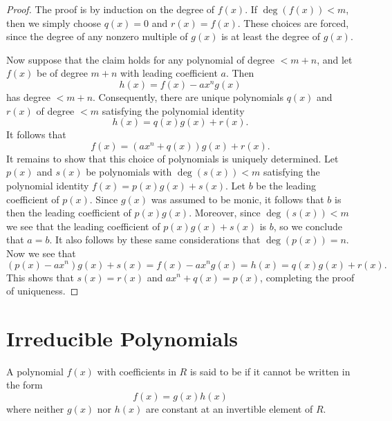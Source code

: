 \begin{proof}
  The proof is by induction on the degree of $f(x)$. If $\deg(f(x))< m$, then we simply choose $q(x)=0$ and $r(x)=f(x)$. These choices are forced, since the degree of any nonzero multiple of $g(x)$ is at least the degree of $g(x)$.

  Now suppose that the claim holds for any polynomial of degree $<m+n$, and let $f(x)$ be of degree $m+n$ with leading coefficient $a$. Then
  \begin{equation*}
    h(x)=f(x)-ax^n g(x)
  \end{equation*}
  has degree $<m+n$. Consequently, there are unique polynomials $q(x)$ and $r(x)$ of degree $<m$ satisfying the polynomial identity
  \begin{equation*}
    h(x)=q(x)g(x)+r(x).
  \end{equation*}
  It follows that
  \begin{equation*}
    f(x)=(ax^n+q(x))g(x)+r(x).
  \end{equation*}
  It remains to show that this choice of polynomials is uniquely determined. Let $p(x)$ and $s(x)$ be polynomials with $\deg(s(x))<m$ satisfying the polynomial identity $f(x)=p(x)g(x)+s(x)$. Let $b$ be the leading coefficient of $p(x)$. Since $g(x)$ was assumed to be monic, it follows that $b$ is then the leading coefficient of $p(x)g(x)$. Moreover, since $\deg(s(x))<m$ we see that the leading coefficient of $p(x)g(x)+s(x)$ is $b$, so we conclude that $a=b$. It also follows by these same considerations that $\deg(p(x))=n$. Now we see that
  \begin{equation*}
    (p(x)-ax^n)g(x)+s(x)=f(x)-ax^ng(x)=h(x)=q(x)g(x)+r(x).
  \end{equation*}
  This shows that $s(x)=r(x)$ and $ax^n+q(x)=p(x)$, completing the proof of uniqueness.
\end{proof}

\section{Irreducible Polynomials}

\begin{definition}
  A polynomial $f(x)$ with coefficients in $R$ is said to be  if it cannot be written in the form
  \begin{equation*}
    f(x)=g(x)h(x)
  \end{equation*}
  where neither $g(x)$ nor $h(x)$ are constant at an invertible element of $R$.
\end{definition}

